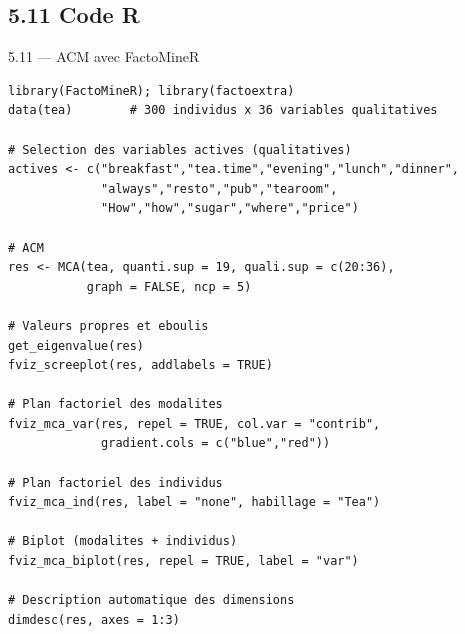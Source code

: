 \subsection{5.11 Code R}
\begin{frame}[fragile]{5.11 — ACM avec FactoMineR}
\begin{lstlisting}
library(FactoMineR); library(factoextra)
data(tea)        # 300 individus x 36 variables qualitatives

# Selection des variables actives (qualitatives)
actives <- c("breakfast","tea.time","evening","lunch","dinner",
             "always","resto","pub","tearoom",
             "How","how","sugar","where","price")

# ACM
res <- MCA(tea, quanti.sup = 19, quali.sup = c(20:36),
           graph = FALSE, ncp = 5)

# Valeurs propres et eboulis
get_eigenvalue(res)
fviz_screeplot(res, addlabels = TRUE)

# Plan factoriel des modalites
fviz_mca_var(res, repel = TRUE, col.var = "contrib",
             gradient.cols = c("blue","red"))

# Plan factoriel des individus
fviz_mca_ind(res, label = "none", habillage = "Tea")

# Biplot (modalites + individus)
fviz_mca_biplot(res, repel = TRUE, label = "var")

# Description automatique des dimensions
dimdesc(res, axes = 1:3)
\end{lstlisting}
\end{frame}


